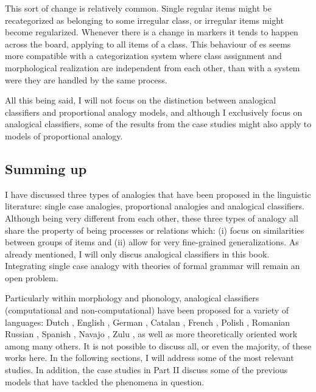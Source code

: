 This sort of change is relatively common. Single regular items might be recategorized as belonging to some irregular class, or irregular items might become regularized. Whenever there is a change in markers it tends to happen across the board, applying to all items of a class. This behaviour of es seems more compatible with a categorization system where class assignment and morphological realization are independent from each other, than with a system were they are handled by the same process.

\largerpage
All this being said, I will not focus on the distinction between analogical classifiers and proportional analogy models, and although I exclusively focus on analogical classifiers, some of the results from the case studies might also apply to models of proportional analogy.


\subsection{Summing up}

I have discussed three types of analogies that have been proposed in the linguistic literature: single case analogies, proportional analogies and analogical classifiers. Although being very different from each other, these three types of analogy all share the property of being processes or relations which: (i) focus on similarities between groups of items and (ii) allow for very fine-grained generalizations. As already mentioned, I will only discus analogical classifiers in this book. Integrating single case analogy with theories of formal grammar will remain an open problem.

Particularly within morphology and phonology, analogical classifiers (computational and non-computational) have been proposed for a variety of languages: Dutch \autocite{Krott.2001}, English \autocites{Bybee.1982, Arndt-Lappe.2011, Arndt-Lappe.2014}, German \autocites{Hahn.2000, Motsch.1977, Kopcke.1988, Kopcke.1998, Schlucker.2011}, Catalan \autocites{Valles.2004, Saldanya.2005}, French \autocite{Holmes.2004, Lyster.2006, Matthews.2005, Matthews.2010}, Polish \autocite{Czaplicki.2013}, Romanian \autocites{Dinu.2012, Vrabie.1989, Vrabie.2000} Russian \autocite{Kapatsinski.2010, Gouskova.2015}, Spanish \autocites{Afonso.2014, Eddington.2002, Eddington.2004, Eddington.2009, Pountain.2006, Rainer.1993, Rainer.2013, Smead.2000}, Navajo \autocite{Eddington.2006}, Zulu \autocite{OBryan.1974}, as well as more theoretically oriented work \autocites{Skousen.1989, Skousen.2002, Skousen.2013} among many others. It is not possible to discuss all, or even the majority, of these works here. In the following sections, I will address some of the most relevant studies. In addition, the case studies in Part II discuss some of the previous models that have tackled the phenomena in question.

